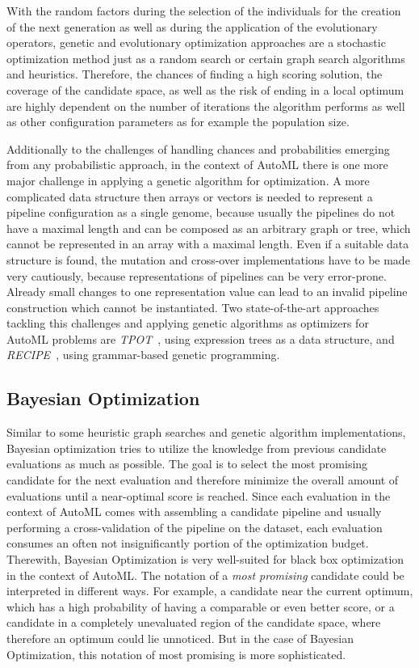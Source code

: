 With the random factors during the selection of the individuals for the creation of the next generation as well as during the application of the evolutionary operators, genetic and evolutionary optimization approaches are a stochastic optimization method just as a random search or certain graph search algorithms and heuristics.
Therefore, the chances of finding a high scoring solution, the coverage of the candidate space, as well as the risk of ending in a local optimum are highly dependent on the number of iterations the algorithm performs as well as other configuration parameters as for example the population size.

Additionally to the challenges of handling chances and probabilities emerging from any probabilistic approach, in the context of AutoML there is one more major challenge in applying a genetic algorithm for optimization.
A more complicated data structure then arrays or vectors is needed to represent a pipeline configuration as a single genome, because usually the pipelines do not have a maximal length and can be composed as an arbitrary graph or tree, which cannot be represented in an array with a maximal length.
Even if a suitable data structure is found, the mutation and cross-over implementations have to be made very cautiously, because representations of pipelines can be very error-prone.
Already small changes to one representation value can lead to an invalid pipeline construction which cannot be instantiated.\newline
Two state-of-the-art approaches tackling this challenges and applying genetic algorithms as optimizers for AutoML problems are \textit{TPOT}~\cite{Olson-Tpot}, using expression trees as a data structure, and \textit{RECIPE}~\cite{Guimar-Recipe}, using grammar-based genetic programming.

\subsection{Bayesian Optimization}
\label{sec:theory:optimization:bayesian}
Similar to some heuristic graph searches and genetic algorithm implementations, Bayesian optimization tries to utilize the knowledge from previous candidate evaluations as much as possible.
The goal is to select the most promising candidate for the next evaluation and therefore minimize the overall amount of evaluations until a near-optimal score is reached.
Since each evaluation in the context of AutoML comes with assembling a candidate pipeline and usually performing a cross-validation of the pipeline on the dataset, each evaluation consumes an often not insignificantly portion of the optimization budget.
Therewith, Bayesian Optimization is very well-suited for black box optimization in the context of AutoML.\newline
The notation of a \textit{most promising} candidate could be interpreted in different ways.
For example, a candidate near the current optimum, which has a high probability of having a comparable or even better score, or a candidate in a completely unevaluated region of the candidate space, where therefore an optimum could lie unnoticed.
But in the case of Bayesian Optimization, this notation of most promising is more sophisticated.

